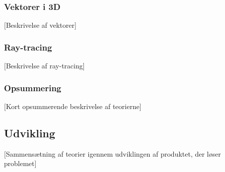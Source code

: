 \subsubsection{Vektorer i 3D}

[Beskrivelse af vektorer]

\subsubsection{Ray-tracing}

[Beskrivelse af ray-tracing]

\subsubsection*{Opsummering}

[Kort opsummerende beskrivelse af teorierne]

\subsection{Udvikling}

[Sammensætning af teorier igennem udviklingen af produktet, der løser problemet]

\clearpage